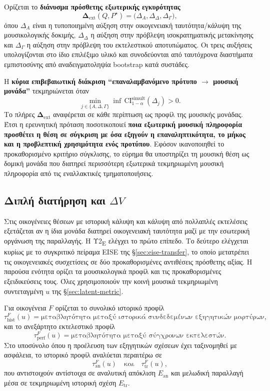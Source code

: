 \documentclass[11pt,a4paper]{article}
\begin{document}
Ορίζεται το \textbf{διάνυσμα πρόσθετης εξωτερικής εγκυρότητας}
\[
\boldsymbol{\Delta}_{\mathrm{ext}}(Q,P^{\star})=
\bigl(\Delta_A,\Delta_{\Delta},\Delta_{\Gamma}\bigr),
\]
όπου $\Delta_A$ είναι η τυποποιημένη αύξηση στην οικογενειακή ταυτότητα/κάλυψη της μουσικολογικής δοκιμής, $\Delta_{\Delta}$ η αύξηση στην πρόβλεψη ισοκρατηματικής μετακίνησης και $\Delta_{\Gamma}$ η αύξηση στην πρόβλεψη του εκτελεστικού αποτυπώματος. Οι τρεις αυξήσεις υπολογίζονται στο ίδιο επιλέξιμο υλικό και συνοδεύονται από ταυτόχρονα διαστήματα εμπιστοσύνης από αναδειγματοληψία bootstrap κατά συστάδες.

Η \textbf{κύρια επιβεβαιωτική διάκριση ``επαναλαμβανόμενο πρότυπο $\rightarrow$ μουσική μονάδα''} τεκμηριώνεται όταν
\[
\min_{j\in\{A,\Delta,\Gamma\}}
\inf\,\mathrm{CI}^{\mathrm{simult}}_{1-\alpha}(\Delta_j)>0.
\]
Το πλήρες $\boldsymbol{\Delta}_{\mathrm{ext}}$ αναφέρεται σε κάθε περίπτωση ως προφίλ της μουσικής μονάδας. Έτσι η ερευνητική πρόταση ποσοτικοποιεί \textbf{ποια εξωτερική μουσική πληροφορία προσθέτει η θέση σε σύγκριση με όσα εξηγούν η επαναληπτικότητα, το μήκος και η προβλεπτική χρησιμότητα ενός προτύπου}.
Εφόσον ικανοποιηθεί το προκαθορισμένο κριτήριο σύγκλισης, το εύρημα θα υποστηρίζει τη μουσική θέση ως δομική μονάδα που διατηρεί περισσότερη εξωτερικά τεκμηριωμένη μουσική πληροφορία από τις εναλλακτικές τμηματοποιήσεις.

\subsection{\texorpdfstring{Διπλή διατήρηση και \(\Delta V\)}{Διπλή διατήρηση και Delta V}}\label{app:stats-double}

Στις οικογένειες θέσεων με ιστορική κάλυψη και κάλυψη από πολλαπλές εκτελέσεις εξετάζεται αν η ίδια μονάδα διατηρεί οικογενειακή ταυτότητα μαζί με την εσωτερική οργάνωση της παραλλαγής. Η Υ2\textsubscript{E} ελέγχει το πρώτο επίπεδο. Το δεύτερο ελέγχεται κυρίως με το συγκριτικό πείραμα EISE της \S\ref{sec:eise-transfer}, το οποίο μετατρέπει τις οικογενειακές συσχετίσεις σε δύο προκαθορισμένες αντιθέσεις πρόσθετης αξίας. Η παρούσα ενότητα ορίζει τα μουσικολογικά προφίλ και τις προκαθορισμένες εξειδικεύσεις τους. Όλες χρησιμοποιούν την κοινή μουσικά τεκμηριωμένη συντεταγμένη $u$ της \S\ref{sec:latent-metric}.

Για οικογένεια $F$ ορίζεται το συνολικό ιστορικό προφίλ
\[
\tau_{\mathrm{hist}}^{F}(u)=\text{μεταβλητότητα μεταξύ ιστορικά συνδεδεμένων εξηγητικών μαρτύρων},
\]
και το ανεξάρτητο εκτελεστικό προφίλ
\[
\tau_{\mathrm{perf}}^{F}(u)=\text{μεταβλητότητα μεταξύ σύγχρονων εκτελεστών}.
\]
Στο υποσύνολο όπου η προέλευση των εξηγητικών σχέσεων έχει ταξινομηθεί με ασφάλεια, το ιστορικό προφίλ αναλύεται περαιτέρω σε
\[
\tau_{\mathrm{an}}^{F}(u)\quad\text{και}\quad\tau_{\mathrm{tr}}^{F}(u),
\]
που αντιστοιχούν αντίστοιχα σε αναλυτική απόκλιση $E_{\mathrm{an}}$ και μελωδική παραλλαγή μέσα σε τεκμηριωμένη ιστορική σχέση $E_{\mathrm{tr}}$.
\end{document}
